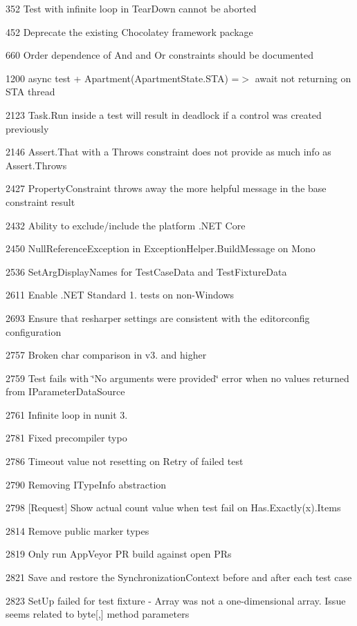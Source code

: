 \begin{DoxyItemize}
\item 352 Test with infinite loop in Tear\+Down cannot be aborted
\item 452 Deprecate the existing Chocolatey framework package
\item 660 Order dependence of And and Or constraints should be documented
\item 1200 async test + Apartment(Apartment\+State.\+S\+TA) =$>$ await not returning on S\+TA thread
\item 2123 Task.\+Run inside a test will result in deadlock if a control was created previously
\item 2146 Assert.\+That with a Throws constraint does not provide as much info as Assert.\+Throws
\item 2427 Property\+Constraint throws away the more helpful message in the base constraint result
\item 2432 Ability to exclude/include the platform .N\+ET Core
\item 2450 Null\+Reference\+Exception in Exception\+Helper.\+Build\+Message on Mono
\item 2536 Set\+Arg\+Display\+Names for Test\+Case\+Data and Test\+Fixture\+Data
\item 2611 Enable .N\+ET Standard 1. tests on non-\/\+Windows
\item 2693 Ensure that resharper settings are consistent with the editorconfig configuration
\item 2757 Broken {\ttfamily char} comparison in v3. and higher
\item 2759 Test fails with \char`\"{}\+No arguments were provided\char`\"{} error when no values returned from I\+Parameter\+Data\+Source
\item 2761 Infinite loop in nunit 3.
\item 2781 Fixed precompiler typo
\item 2786 Timeout value not resetting on Retry of failed test
\item 2790 Removing I\+Type\+Info abstraction
\item 2798 \mbox{[}Request\mbox{]} Show actual count value when test fail on Has.\+Exactly(x).Items
\item 2814 Remove public marker types
\item 2819 Only run App\+Veyor PR build against open P\+Rs
\item 2821 Save and restore the Synchronization\+Context before and after each test case
\item 2823 Set\+Up failed for test fixture -\/ Array was not a one-\/dimensional array. Issue seems related to byte\mbox{[},\mbox{]} method parameters

\end{DoxyItemize}
